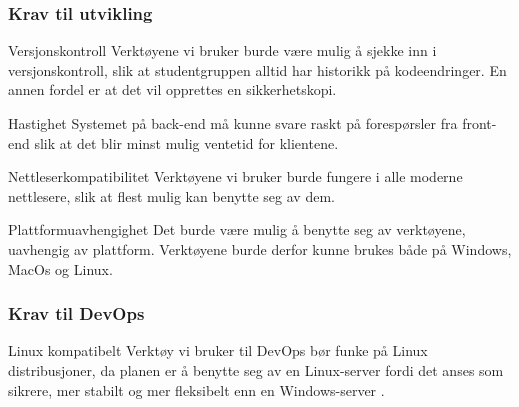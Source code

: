 \subsubsection{Krav til utvikling}
\label{sec:analysis-tools-requirements-back-end}
\begin{compactdesc}
\item [Versjonskontroll] Verktøyene vi bruker burde være mulig å sjekke inn i versjonskontroll, slik at studentgruppen alltid har historikk på kodeendringer. En annen fordel er at det vil opprettes en sikkerhetskopi.
\item [Hastighet] Systemet på back-end må kunne svare raskt på forespørsler fra front-end slik at det blir minst mulig ventetid for klientene.
\item [Nettleserkompatibilitet] Verktøyene vi bruker burde fungere i alle moderne nettlesere, slik at flest mulig kan benytte seg av dem.
\item [Plattformuavhengighet] Det burde være mulig å benytte seg av verktøyene, uavhengig av plattform. Verktøyene burde derfor kunne brukes både på Windows, MacOs og Linux.
\end{compactdesc}

\subsubsection{Krav til DevOps}
\begin{compactdesc}
\item [Linux kompatibelt] Verktøy vi bruker til DevOps bør funke på Linux distribusjoner, da planen er å benytte seg av en Linux-server fordi det anses som sikrere, mer stabilt og mer fleksibelt enn en Windows-server \cite{cabrera2009windows}.
\end{compactdesc}





